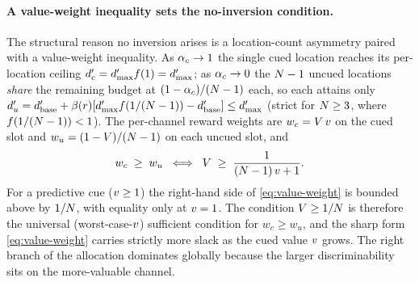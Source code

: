 \paragraph{A value-weight inequality sets the no-inversion condition.}
The structural reason no inversion arises is a location-count asymmetry
paired with a value-weight inequality. As $\alpha_c \to 1$ the single
cued location reaches its per-location ceiling $d'_c = d'_{\max}
f(1) = d'_{\max}$; as $\alpha_c \to 0$ the $N - 1$ uncued
locations \emph{share} the remaining budget at $(1-\alpha_c)/(N-1)$
each, so each attains only $d'_u = d'_{\mathrm{base}} +
\beta(r)[d'_{\max} f(1/(N-1)) - d'_{\mathrm{base}}]
\le d'_{\max}$ (strict for $N \ge 3$, where $f(1/(N-1)) < 1$).
The per-channel reward weights are $w_c = V\,v$ on the cued slot
and $w_u = (1-V)/(N-1)$ on each uncued slot, and
%
\begin{equation}
  w_c \;\ge\; w_u
  \;\iff\;
  V \;\ge\; \frac{1}{(N - 1)\,v + 1}.
  \label{eq:value-weight}
\end{equation}
%
For a predictive cue ($v \ge 1$) the right-hand side of
\eqref{eq:value-weight} is bounded above by $1/N$, with equality
only at $v = 1$. The condition $V \ge 1/N$ is therefore the
universal (worst-case-$v$) sufficient condition for $w_c \ge w_u$,
and the sharp form \eqref{eq:value-weight} carries strictly more slack
as the cued value $v$ grows. The right branch of the allocation
dominates globally because the larger discriminability sits on the
more-valuable channel.

